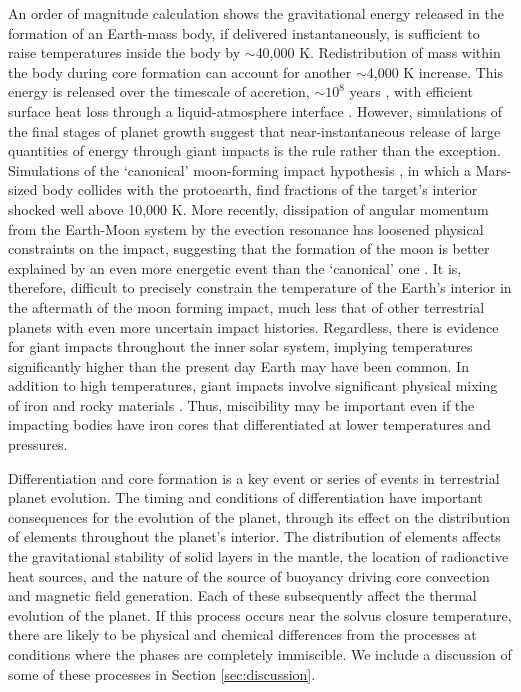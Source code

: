 An order of magnitude calculation shows the gravitational energy released in the
formation of an Earth-mass body, if delivered instantaneously, is sufficient to raise
temperatures inside the body by $\sim$40,000 K.  Redistribution of mass within the body
during core formation can account for another $\sim$4,000 K increase. This energy is
released over the timescale of accretion, $\sim$$10^{8}$ years \citep{Chambers1998}, with
efficient surface heat loss through a liquid-atmosphere interface
\citep{Abe1997,Elkins-Tanton2012}. However, simulations of the final stages of planet
growth \citep{Cameron1991,Chambers1998,Canup2000} suggest that near-instantaneous release
of large quantities of energy through giant impacts is  the rule rather than the
exception.  Simulations of the `canonical' moon-forming impact hypothesis
\citep{canup2004}, in which a Mars-sized body collides with the protoearth, find fractions
of the target's interior shocked well above 10,000 K. More recently, dissipation of
angular momentum from the Earth-Moon system by the evection resonance has loosened
physical constraints on the impact, suggesting that the formation of the moon is better
explained by an even more energetic event than the `canonical' one \citep{Canup2012,Cuk2012}.
It is, therefore, difficult to precisely constrain the temperature of the Earth's
interior in the aftermath of the moon forming impact, much less that of other terrestrial
planets with even more uncertain impact histories. Regardless, there is evidence for
giant impacts throughout the inner solar system, implying temperatures significantly
higher than the present day Earth may have been common. In addition to high temperatures,
giant impacts involve significant physical mixing of iron and rocky materials
\citep{Dahl2010}.  Thus, miscibility may be important even if the impacting bodies have
iron cores that differentiated at lower temperatures and pressures.

Differentiation and core formation is a key event or series of events in terrestrial
planet evolution. The timing and conditions of differentiation have important
consequences for the evolution of the planet, through its effect on the distribution of
elements throughout the planet's interior. The distribution of elements affects the
gravitational stability of solid layers in the mantle, the location of radioactive heat
sources, and the nature of the source of buoyancy driving core convection and magnetic
field generation. Each of these subsequently affect the thermal evolution of the planet.
If this process occurs near the solvus closure temperature, there are likely to be
physical and chemical differences from the processes at conditions where the phases are
completely immiscible. We include a discussion of some of these processes in Section
\ref{sec:discussion}.

